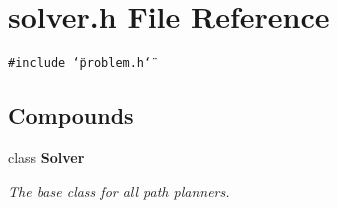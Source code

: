 \section{solver.h File Reference}
\label{solver_h}
{\tt \#include \char`\"{}problem.h\char`\"{}}\par
\subsection*{Compounds}
\begin{CompactItemize}
\item 
class {\bf Solver}
\begin{CompactList}\small\item\em The base class for all path planners.\item\end{CompactList}\end{CompactItemize}
